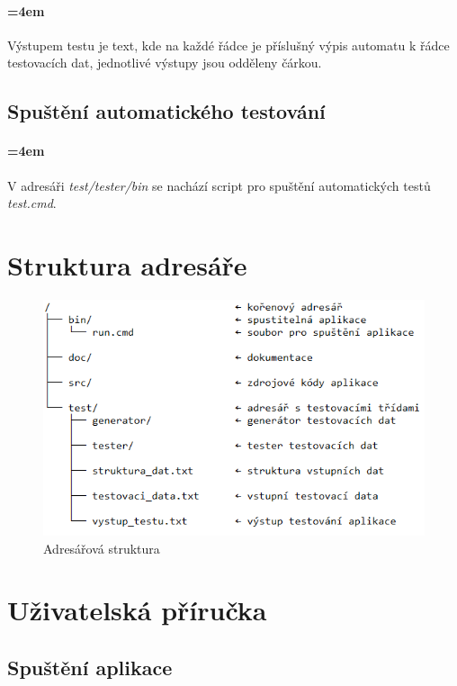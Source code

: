 \documentclass[12pt,a4paper]{article}
\begin{document}
\paragraph{\parindent=4em}{	
	Výstupem testu je text, kde na každé řádce je příslušný výpis automatu k řádce testovacích dat, jednotlivé výstupy jsou odděleny čárkou.
}

\subsection{Spuštění automatického testování}

\paragraph{\parindent=4em}{	
	V adresáři {\it test/tester/bin} se nachází script pro spuštění automatických testů {\it test.cmd}.
}

\section{Struktura adresáře}

\begin{figure}[H]	
	\centering
	\includegraphics[width=\textwidth]{images/adresar}
	\caption{Adresářová struktura}
\end{figure}

\section{Uživatelská příručka}

\subsection{Spuštění aplikace}
\end{document}

